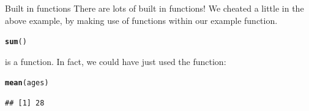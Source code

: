 \documentclass{beamer}\usepackage[]{graphicx}\usepackage[]{color}
\makeatletter
\newcommand{\hlstd}[1]{\textcolor[rgb]{0.345,0.345,0.345}{#1}}%
\newcommand{\hlkwd}[1]{\textcolor[rgb]{0.737,0.353,0.396}{\textbf{#1}}}%
\newenvironment{kframe}{%
 \def\at@end@of@kframe{}%
 \ifinner\ifhmode%
  \def\at@end@of@kframe{\end{minipage}}%
  \begin{minipage}{\columnwidth}%
 \fi\fi%
 \def\FrameCommand##1{\hskip\@totalleftmargin \hskip-\fboxsep
 \colorbox{shadecolor}{##1}\hskip-\fboxsep
     \hskip-\linewidth \hskip-\@totalleftmargin \hskip\columnwidth}%
 \MakeFramed {\advance\hsize-\width
   \@totalleftmargin\z@ \linewidth\hsize
   \@setminipage}}%
 {\par\unskip\endMakeFramed%
 \at@end@of@kframe}
\newenvironment{knitrout}{}{} %
\makeatother
\begin{document}
\begin{frame}[fragile]{Built in functions}
There are lots of built in functions!
\linebreak
We cheated a little in the above example, by making use of functions within our example function.
\linebreak
\linebreak
\begin{knitrout}
\color{fgcolor}\begin{kframe}
\begin{alltt}
\hlkwd{sum}\hlstd{()}
\end{alltt}
\end{kframe}
\end{knitrout}

is a function.
\linebreak
\linebreak
In fact, we could have just used the function:
\begin{knitrout}
\color{fgcolor}\begin{kframe}
\begin{alltt}
\hlkwd{mean}\hlstd{(ages)}
\end{alltt}
\begin{verbatim}
## [1] 28
\end{verbatim}
\end{kframe}
\end{knitrout}

\end{frame}

\end{document}
